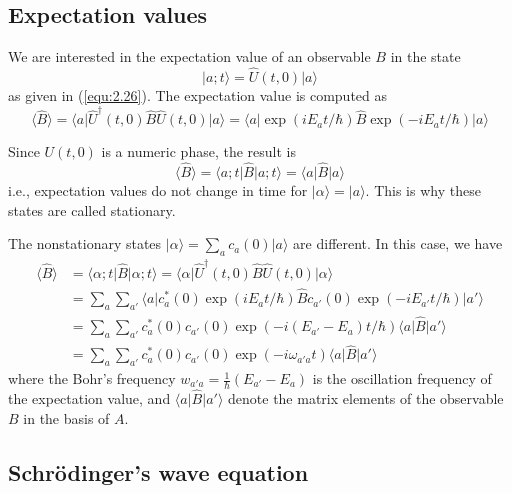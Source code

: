 \subsection{Expectation values}
We are interested in the expectation value of an observable
$B$ in the state
$$
  \vert a;t\rangle  = \hat{U}(t,0) \vert a\rangle 
$$
as given in (\ref{equ:2.26}). The expectation value is
computed as
$$
\langle \hat{B}\rangle  = \langle a\vert \hat{U}^{\dagger}(t,0) \hat{B} \hat{U}(t,0) \vert a\rangle 
= 
\langle a\vert \exp(iE_a t/\hbar) \hat{B} \exp(-i E_a t/\hbar) \vert a\rangle 
$$

Since $U(t,0)$ is a numeric phase, the result is
\begin{equation}
  \langle \hat{B}\rangle  = \langle a;t\vert \hat{B}\vert a;t\rangle  = \langle a\vert \hat{B}\vert a\rangle 
  \label{equ:2.26}
\end{equation}
i.e., expectation values do not change in time for $\vert \alpha\rangle 
= \vert a\rangle $. This is why these states are called stationary.

The nonstationary states $\vert \alpha\rangle  = \sum_a c_a(0) \vert a\rangle $ are
different. In this case, we have
\begin{align*}
  \langle \hat{B}\rangle  &= \langle \alpha;t\vert \hat{B}\vert \alpha;t\rangle  =
  \langle \alpha\vert \hat{U}^{\dagger}(t,0)
  \hat{B}\hat{U}(t,0)\vert \alpha\rangle \\
  &=
  \sum_a \sum_{a'} \langle a\vert c^*_a(0) \exp(i E_a t/\hbar)
  \hat{B}c_{a'}(0)\exp(-i E_{a'} t/\hbar)\vert a'\rangle \\
  &=
  \sum_a \sum_{a'} c_a^*(0) c_{a'}(0) \exp(-i (E_{a'}-E_a)t/
  \hbar) \langle a\vert \hat{B}\vert a'\rangle \\
  &=
  \sum_a \sum_{a'} c_a^*(0) c_{a'}(0) \exp(-i \omega_{a' a}t)
  \langle a\vert \hat{B}\vert a'\rangle 
\end{align*}
where the Bohr's frequency $w_{a'a} =
\frac{1}{\hbar}(E_{a'}-E_a)$ is the oscillation frequency of
the expectation value, and $\langle a\vert \hat{B}\vert a'\rangle $ denote the
matrix elements of the observable $B$ in the basis of $A$.

\subsection{Schrödinger's wave equation}

